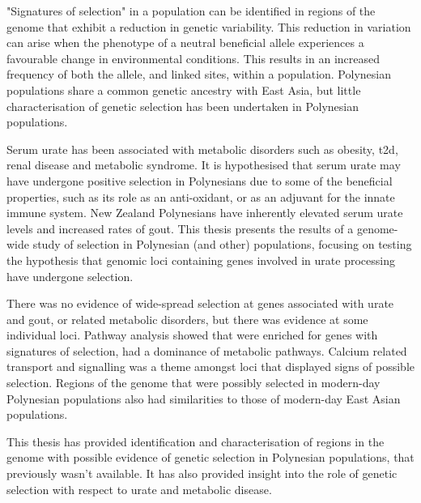 "Signatures of selection" in a population can be identified in regions of the genome that exhibit a reduction in genetic variability. This reduction in variation can arise when the phenotype of a neutral beneficial allele experiences a favourable change in environmental conditions. This results in an increased frequency of both the allele, and linked sites, within a population. Polynesian populations share a common genetic ancestry with East Asia, but little characterisation of genetic selection has been undertaken in Polynesian populations.

Serum urate has been associated with metabolic disorders such as obesity, \gls{t2d}, renal disease and metabolic syndrome. It is hypothesised that serum urate may have undergone positive selection in Polynesians due to some of the beneficial properties, such as its role as an anti-oxidant, or as an adjuvant for the innate immune system. New Zealand Polynesians have inherently elevated serum urate levels and increased rates of gout. This thesis presents the results of a genome-wide study of selection in Polynesian (and other) populations, focusing on testing the hypothesis that genomic loci containing genes involved in urate processing have undergone selection.

There was no evidence of wide-spread selection at genes associated with urate and gout, or related metabolic disorders, but there was evidence at some individual loci. Pathway analysis showed that were enriched for genes with signatures of selection, had a dominance of metabolic pathways. Calcium related transport and signalling was a theme amongst loci that displayed signs of possible selection. Regions of the genome that were possibly selected in modern-day Polynesian populations also had similarities to those of modern-day East Asian populations.

This thesis has provided identification and characterisation of regions in the genome with possible evidence of genetic selection in Polynesian populations, that previously wasn't available. It has also provided insight into the role of genetic selection with respect to urate and metabolic disease.